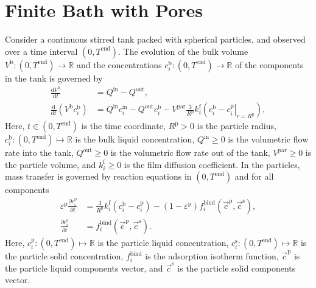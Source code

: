 \documentclass{article}
\begin{document}
\section*{Finite Bath with Pores}
Consider a continuous stirred tank packed with spherical particles, and observed over a time interval $(0, T^{\mathrm{end}})$.
The evolution of the bulk volume $V^{\mathrm{b}}\colon (0, T^{\mathrm{end}}) \to \mathbb{R}$ and the concentrations $c^{\mathrm{b}}_{i}\colon (0, T^{\mathrm{end}}) \to \mathbb{R}$ of the components in the tank is governed by
\begin{align}
    \frac{\mathrm{d}V^{\mathrm{b}}}{\mathrm{d}t}
    &= Q^{\mathrm{in}}
        - Q^{\mathrm{out}},
    \\
    \frac{\mathrm{d}}{\mathrm{d} t} \left( V^{\mathrm{b}} c^{\mathrm{b}}_{i} \right)
    &= Q^{\mathrm{in}} c^{\mathrm{in}}_{i}
        - Q^{\mathrm{out}} c^{\mathrm{b}}_{i}
        - V^{\mathrm{par}} \frac{3}{R^{\mathrm{p}}} k^{\mathrm{f}}_{i} \left(c^{\mathrm{b}}_{i} - \left. c^{\mathrm{p}}_{i} \right|_{r = R^{\mathrm{p}}} \right),
\end{align}
Here, $t\in (0, T^{\mathrm{end}})$ is the time coordinate, $R^{\mathrm{p}}> 0$ is the particle radius, $c^{\mathrm{b}}_{i}\colon (0, T^{\mathrm{end}}) \mapsto \mathbb{R}$ is the bulk liquid concentration, $Q^{\mathrm{in}}\geq 0$ is the volumetric flow rate into the tank, $Q^{\mathrm{out}}\geq 0$ is the volumetric flow rate out of the tank, $V^{\mathrm{par}}\geq 0$ is the particle volume, and $k^{\mathrm{f}}_{i}\geq 0$ is the film diffusion coefficient.
In the particles, mass transfer is governed by reaction equations in $(0, T^{\mathrm{end}})$ and for all components
\begin{align}
    \varepsilon^{\mathrm{p}}\frac{\partial c^{\mathrm{p}}_{i}}{\partial t}
    &= \frac{3}{R^{\mathrm{p}}} k^{\mathrm{f}}_{i} \left( c^{\mathrm{b}}_{i} - c^{\mathrm{p}}_{i} \right)
        - \left( 1 - \varepsilon^{\mathrm{p}} \right) f^{\mathrm{bind}}_{i}\left( \vec{c}^{\mathrm{p}}, \vec{c}^{\mathrm{s}} \right),
    \\
    \frac{\partial c^{\mathrm{s}}_{i}}{\partial t}
    &= f^{\mathrm{bind}}_{i}\left( \vec{c}^{\mathrm{p}}, \vec{c}^{\mathrm{s}} \right).
\end{align}
Here, $c^{\mathrm{p}}_{i}\colon (0, T^{\mathrm{end}}) \mapsto \mathbb{R}$ is the particle liquid concentration, $c^{\mathrm{s}}_{i}\colon (0, T^{\mathrm{end}}) \mapsto \mathbb{R}$ is the particle solid concentration, $f^{\mathrm{bind}}_{i}$ is the adsorption isotherm function, $\vec{c}^{\mathrm{p}}$ is the particle liquid components vector, and $\vec{c}^{\mathrm{s}}$ is the particle solid components vector.
\end{document}
